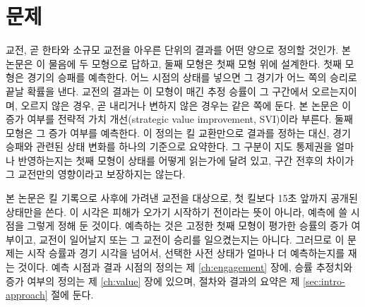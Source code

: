 \section{문제}
\label{sec:intro-problem}

교전, 곧 한타와 소규모 교전을 아우른 단위의 결과를 어떤 양으로 정의할 것인가. 본 논문은 이 물음에 두 모형으로 답하고, 둘째 모형은 첫째 모형 위에 설계한다. 첫째 모형은 경기의 승패를 예측한다. 어느 시점의 상태를 넣으면 그 경기가 어느 쪽의 승리로 끝날 확률을 낸다. 교전의 결과는 이 모형이 매긴 추정 승률이 그 구간에서 오르는지이며, 오르지 않은 경우, 곧 내리거나 변하지 않은 경우는 같은 쪽에 둔다. 본 논문은 이 증가 여부를 전략적 가치 개선(strategic value improvement, SVI)이라 부른다. 둘째 모형은 그 증가 여부를 예측한다. 이 정의는 킬 교환만으로 결과를 정하는 대신, 경기 승패와 관련된 상태 변화를 하나의 기준으로 요약한다. 그 구분이 지도 통제권을 얼마나 반영하는지는 첫째 모형이 상태를 어떻게 읽는가에 달려 있고, 구간 전후의 차이가 그 교전만의 영향이라고 보장하지는 않는다.

본 논문은 킬 기록으로 사후에 가려낸 교전을 대상으로, 첫 킬보다 15초 앞까지 공개된 상태만을 쓴다. 이 시각은 피해가 오가기 시작하기 전이라는 뜻이 아니라, 예측에 쓸 시점을 그렇게 정해 둔 것이다. 예측하는 것은 고정한 첫째 모형이 평가한 승률의 증가 여부이고, 교전이 일어날지 또는 그 교전이 승리를 일으켰는지는 아니다. 그러므로 이 문제는 시작 승률과 경기 시각을 넘어서, 선택한 사전 상태가 얼마나 더 예측하는지를 재는 것이다. 예측 시점과 결과 시점의 정의는 제 \ref{ch:engagement} 장에, 승률 추정치와 증가 여부의 정의는 제 \ref{ch:value} 장에 있으며, 절차와 결과의 요약은 제 \ref{sec:intro-approach} 절에 둔다.
